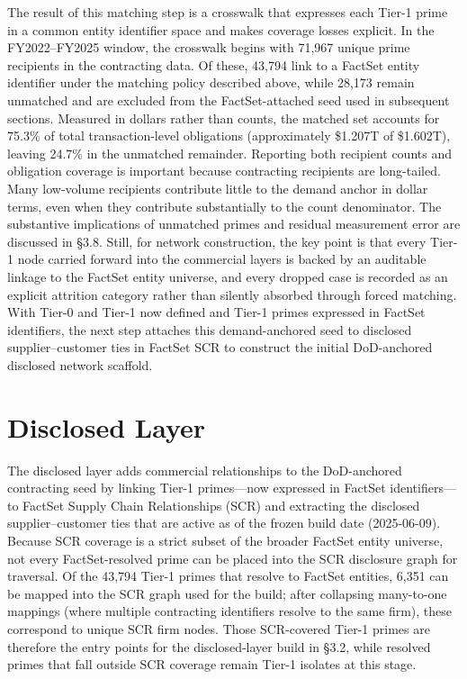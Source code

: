 The result of this matching step is a crosswalk that expresses each Tier-1 prime in a common entity identifier space and makes coverage losses explicit. In the FY2022--FY2025 window, the crosswalk begins with 71{,}967 unique prime recipients in the contracting data. Of these, 43{,}794 link to a FactSet entity identifier under the matching policy described above, while 28{,}173 remain unmatched and are excluded from the FactSet-attached seed used in subsequent sections. Measured in dollars rather than counts, the matched set accounts for 75.3\% of total transaction-level obligations (approximately \$1.207T of \$1.602T), leaving 24.7\% in the unmatched remainder. Reporting both recipient counts and obligation coverage is important because contracting recipients are long-tailed. Many low-volume recipients contribute little to the demand anchor in dollar terms, even when they contribute substantially to the count denominator. The substantive implications of unmatched primes and residual measurement error are discussed in \S3.8. Still, for network construction, the key point is that every Tier-1 node carried forward into the commercial layers is backed by an auditable linkage to the FactSet entity universe, and every dropped case is recorded as an explicit attrition category rather than silently absorbed through forced matching. With Tier-0 and Tier-1 now defined and Tier-1 primes expressed in FactSet identifiers, the next step attaches this demand-anchored seed to disclosed supplier--customer ties in FactSet SCR to construct the initial DoD-anchored disclosed network scaffold.

\section{Disclosed Layer}

The disclosed layer adds commercial relationships to the DoD-anchored contracting seed by linking Tier-1 primes---now expressed in FactSet identifiers---to FactSet Supply Chain Relationships (SCR) and extracting the disclosed supplier--customer ties that are active as of the frozen build date (\mbox{2025-06-09}). Because SCR coverage is a strict subset of the broader FactSet entity universe, not every FactSet-resolved prime can be placed into the SCR disclosure graph for traversal. Of the 43{,}794 Tier-1 primes that resolve to FactSet entities, 6{,}351 can be mapped into the SCR graph used for the build; after collapsing many-to-one mappings (where multiple contracting identifiers resolve to the same firm), these correspond to \NumPrimes unique SCR firm nodes. Those \NumPrimes SCR-covered Tier-1 primes are therefore the entry points for the disclosed-layer build in \S3.2, while resolved primes that fall outside SCR coverage remain Tier-1 isolates at this stage.

